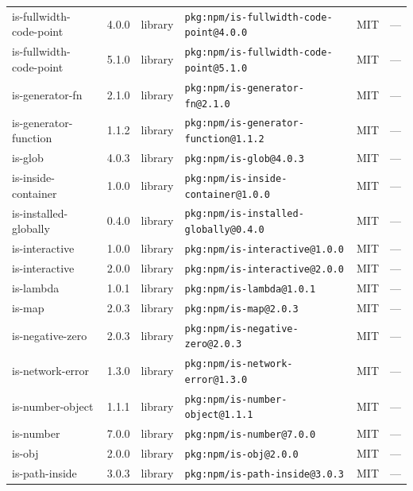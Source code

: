 \documentclass[11pt,a4paper]{article}
\begin{document}
\begin{longtable}{|p{4cm}|p{2cm}|p{1.6cm}|p{5cm}|p{1.5cm}|p{3.5cm}|}
\raggedright is-fullwidth-code-point & 4.0.0 & library & \small\texttt{pkg:npm/is-fullwidth-code-point@4.0.0} & MIT & \small — \\
\raggedright is-fullwidth-code-point & 5.1.0 & library & \small\texttt{pkg:npm/is-fullwidth-code-point@5.1.0} & MIT & \small — \\
\raggedright is-generator-fn & 2.1.0 & library & \small\texttt{pkg:npm/is-generator-fn@2.1.0} & MIT & \small — \\
\raggedright is-generator-function & 1.1.2 & library & \small\texttt{pkg:npm/is-generator-function@1.1.2} & MIT & \small — \\
\raggedright is-glob & 4.0.3 & library & \small\texttt{pkg:npm/is-glob@4.0.3} & MIT & \small — \\
\raggedright is-inside-container & 1.0.0 & library & \small\texttt{pkg:npm/is-inside-container@1.0.0} & MIT & \small — \\
\raggedright is-installed-globally & 0.4.0 & library & \small\texttt{pkg:npm/is-installed-globally@0.4.0} & MIT & \small — \\
\raggedright is-interactive & 1.0.0 & library & \small\texttt{pkg:npm/is-interactive@1.0.0} & MIT & \small — \\
\raggedright is-interactive & 2.0.0 & library & \small\texttt{pkg:npm/is-interactive@2.0.0} & MIT & \small — \\
\raggedright is-lambda & 1.0.1 & library & \small\texttt{pkg:npm/is-lambda@1.0.1} & MIT & \small — \\
\raggedright is-map & 2.0.3 & library & \small\texttt{pkg:npm/is-map@2.0.3} & MIT & \small — \\
\raggedright is-negative-zero & 2.0.3 & library & \small\texttt{pkg:npm/is-negative-zero@2.0.3} & MIT & \small — \\
\raggedright is-network-error & 1.3.0 & library & \small\texttt{pkg:npm/is-network-error@1.3.0} & MIT & \small — \\
\raggedright is-number-object & 1.1.1 & library & \small\texttt{pkg:npm/is-number-object@1.1.1} & MIT & \small — \\
\raggedright is-number & 7.0.0 & library & \small\texttt{pkg:npm/is-number@7.0.0} & MIT & \small — \\
\raggedright is-obj & 2.0.0 & library & \small\texttt{pkg:npm/is-obj@2.0.0} & MIT & \small — \\
\raggedright is-path-inside & 3.0.3 & library & \small\texttt{pkg:npm/is-path-inside@3.0.3} & MIT & \small — \\

\end{longtable}
\end{document}
